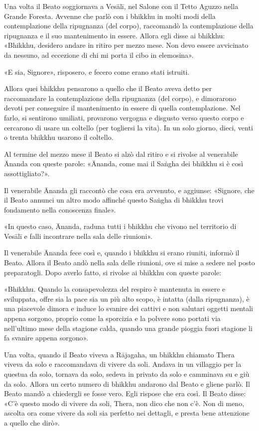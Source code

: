 
Una volta il Beato soggiornava a Vesālī, nel Salone con il Tetto Aguzzo nella
Grande Foresta. Avvenne che parlò con i bhikkhu in molti modi della
contemplazione della ripugnanza (del corpo), raccomandò la contemplazione della
ripugnanza e il suo mantenimento in essere. Allora egli disse ai bhikkhu:
«Bhikkhu, desidero andare in ritiro per mezzo mese. Non devo essere avvicinato
da nessuno, ad eccezione di chi mi porta il cibo in elemosina».

«E sia, Signore», risposero, e fecero come erano stati istruiti.

Allora quei bhikkhu pensarono a quello che il Beato aveva detto per raccomandare
la contemplazione della ripugnanza (del corpo), e dimorarono devoti per
conseguire il mantenimento in essere di quella contemplazione. Nel farlo, si
sentirono umiliati, provarono vergogna e disgusto verso questo corpo e cercarono
di usare un coltello (per togliersi la vita). In un solo giorno, dieci, venti o
trenta bhikkhu usarono il coltello.

Al termine del mezzo mese il Beato si alzò dal ritiro e si rivolse al venerabile
Ānanda con queste parole: «Ānanda, come mai il Saṅgha dei bhikkhu si è così
assottigliato?».

Il venerabile Ānanda gli raccontò che cosa era avvenuto, e aggiunse: «Signore,
che il Beato annunci un altro modo affinché questo Saṅgha di bhikkhu trovi
fondamento nella conoscenza finale».

«In questo caso, Ānanda, raduna tutti i bhikkhu che vivono nel territorio di
Vesālī e falli incontrare nella sala delle riunioni».

Il venerabile Ānanda fece così e, quando i bhikkhu si erano riuniti, informò il
Beato. Allora il Beato andò nella sala delle riunioni, ove si mise a sedere nel
posto preparatogli. Dopo averlo fatto, si rivolse ai bhikkhu con queste parole:

«Bhikkhu. Quando la consapevolezza del respiro è mantenuta in essere e
sviluppata, offre sia la pace sia un più alto scopo, è intatta (dalla
ripugnanza), è una piacevole dimora e induce lo svanire dei cattivi e non
salutari oggetti mentali appena sorgono, proprio come la sporcizia e la polvere
sono portati via nell’ultimo mese della stagione calda, quando una grande
pioggia fuori stagione li fa svanire appena sorgono».


Una volta, quando il Beato viveva a Rājagaha, un bhikkhu chiamato Thera viveva
da solo e raccomandava di vivere da soli. Andava in un villaggio per la questua
da solo, tornava da solo, sedeva in privato da solo e camminava su e giù da
solo. Allora un certo numero di bhikkhu andarono dal Beato e gliene parlò. Il
Beato mandò a chiedergli se fosse vero. Egli rispose che era così. Il Beato
disse: «C’è questo modo di vivere da soli, Thera, non dico che non c’è. Non di
meno, ascolta ora come vivere da soli sia perfetto nei dettagli, e presta bene
attenzione a quello che dirò».


